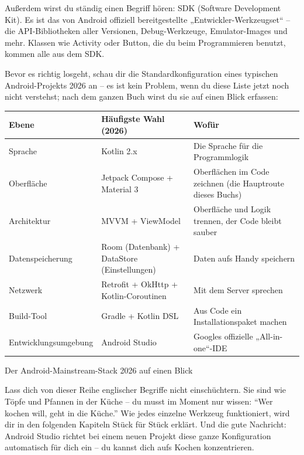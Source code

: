 Außerdem wirst du ständig einen Begriff hören: SDK (Software Development Kit). Es ist das von Android offiziell bereitgestellte „Entwickler-Werkzeugset“ – die API-Bibliotheken aller Versionen, Debug-Werkzeuge, Emulator-Images und mehr. Klassen wie Activity oder Button, die du beim Programmieren benutzt, kommen alle aus dem SDK.


Bevor es richtig losgeht, schau dir die Standardkonfiguration eines typischen Android-Projekts 2026 an – es ist kein Problem, wenn du diese Liste jetzt noch nicht verstehst; nach dem ganzen Buch wirst du sie auf einen Blick erfassen:

\begin{center}
\begin{tabularx}{\linewidth}{|X|X|X|}
\hline
\textbf{Ebene} & \textbf{Häufigste Wahl (2026)} & \textbf{Wofür} \tabularnewline
\hline
Sprache & Kotlin 2.x & Die Sprache für die Programmlogik \tabularnewline
Oberfläche & Jetpack Compose + Material 3 & Oberflächen im Code zeichnen (die Hauptroute dieses Buchs) \tabularnewline
Architektur & MVVM + ViewModel & Oberfläche und Logik trennen, der Code bleibt sauber \tabularnewline
Datenspeicherung & Room (Datenbank) + DataStore (Einstellungen) & Daten aufs Handy speichern \tabularnewline
Netzwerk & Retrofit + OkHttp + Kotlin-Coroutinen & Mit dem Server sprechen \tabularnewline
Build-Tool & Gradle + Kotlin DSL & Aus Code ein Installationspaket machen \tabularnewline
Entwicklungsumgebung & Android Studio & Googles offizielle „All-in-one“-IDE \tabularnewline
\hline
\end{tabularx}
\end{center}

\begin{center}\small\color{gray}Der Android-Mainstream-Stack 2026 auf einen Blick\end{center}

Lass dich von dieser Reihe englischer Begriffe nicht einschüchtern. Sie sind wie Töpfe und Pfannen in der Küche – du musst im Moment nur wissen: “Wer kochen will, geht in die Küche.” Wie jedes einzelne Werkzeug funktioniert, wird dir in den folgenden Kapiteln Stück für Stück erklärt. Und die gute Nachricht: Android Studio richtet bei einem neuen Projekt diese ganze Konfiguration automatisch für dich ein – du kannst dich aufs Kochen konzentrieren.


